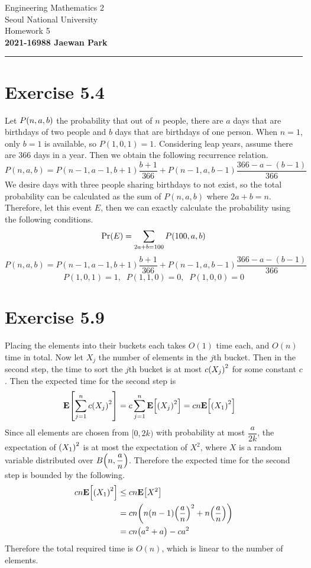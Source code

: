 \documentclass{article}
\begin{document}
\vspace*{-1.5cm}
{\centering \vbox{%
\vspace{2mm}
\large
Engineering Mathematics 2 \hfill
\\
Seoul National University
\\[4mm]
Homework 5\\
\textbf{2021-16988 Jaewan Park} \\[0.8mm]
}}
\par\noindent\rule{\textwidth}{0.5pt}

\section*{Exercise 5.4}
Let $P\qty(n, a, b)$ the probability that out of $n$ people, there are $a$ days that are birthdays of two people and $b$ days that are birthdays of one person.
When $n=1$, only $b=1$ is available, so $P(1, 0, 1) = 1$.
Considering leap years, assume there are 366 days in a year. Then we obtain the following recurrence relation.
$$P(n, a, b) = P(n-1, a-1, b+1)\frac{b+1}{366} + P(n-1, a, b-1)\frac{366-a-(b-1)}{366}$$
We desire days with three people sharing birthdays to not exist, so the total probability can be calculated as the sum of $P(n, a, b)$ where $2a+b = n$.
Therefore, let this event $E$, then we can exactly calculate the probability using the following conditions.
$$\mathrm{Pr}\qty(E) = \sum_{2a+b=100}P(100, a, b)$$
$$P(n, a, b) = P(n-1, a-1, b+1)\frac{b+1}{366} + P(n-1, a, b-1)\frac{366-a-(b-1)}{366}$$
$$P(1, 0, 1) = 1, \;\; P(1, 1, 0) = 0, \;\; P(1, 0, 0) = 0$$

\section*{Exercise 5.9}
Placing the elements into their buckets each takes $O(1)$ time each, and $O(n)$ time in total.
Now let $X_j$ the number of elements in the $j$th bucket. Then in the second step, the time to sort the $j$th bucket is at most $c\qty(X_j)^2$ for some constant $c$.
Then the expected time for the second step is
\begin{align*}
    \mathbf{E}\qty[\sum_{j=1}^{n}c\qty(X_j)^2] &= c\sum_{j=1}^{n}\mathbf{E}\qty[\qty(X_j)^2] = cn\mathbf{E}\qty[\qty(X_1)^2]
\end{align*}
Since all elements are chosen from $[0, 2k)$ with probability at most $\dfrac{a}{2k}$, the expectation of $\qty(X_1)^2$ is at most the expectation of $X^2$, where $X$ is a random variable distributed over $B\qty(n, \dfrac{a}{n})$.
Therefore the expected time for the second step is bounded by the following.
\begin{align*}
    cn\mathbf{E}\qty[\qty(X_1)^2] &\leq cn\mathbf{E}\qty[X^2] \\
    &= cn\qty(n(n-1)\qty(\frac{a}{n})^2 + n\qty(\frac{a}{n})) \\
    &= cn\qty(a^2 + a) - ca^2
\end{align*}
Therefore the total required time is $O(n)$, which is linear to the number of elements.
\end{document}
